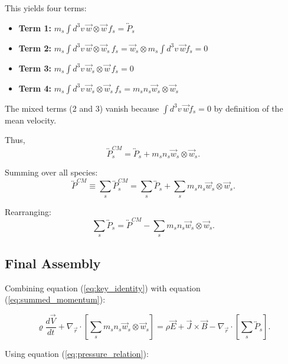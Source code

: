This yields four terms:
\begin{itemize}
\item \textbf{Term 1:} $\displaystyle m_s \int d^3v \, \vec{w} \otimes \vec{w} \, f_s = \overleftrightarrow{P}_s$
\item \textbf{Term 2:} $\displaystyle m_s \int d^3v \, \vec{w} \otimes \vec{w}_s \, f_s = \vec{w}_s \otimes m_s \int d^3v \, \vec{w} f_s = 0$
\item \textbf{Term 3:} $\displaystyle m_s \int d^3v \, \vec{w}_s \otimes \vec{w} \, f_s = 0$
\item \textbf{Term 4:} $\displaystyle m_s \int d^3v \, \vec{w}_s \otimes \vec{w}_s \, f_s = m_s n_s \vec{w}_s \otimes \vec{w}_s$
\end{itemize}

The mixed terms (2 and 3) vanish because $\int d^3v \, \vec{w} f_s = 0$ by definition of the mean velocity.

Thus,
\begin{equation*}
\overleftrightarrow{P}_s^{CM} = \overleftrightarrow{P}_s + m_s n_s \vec{w}_s \otimes \vec{w}_s.
\end{equation*}

Summing over all species:
\begin{equation}
\overleftrightarrow{P}^{CM} \equiv \sum_s \overleftrightarrow{P}_s^{CM} = \sum_s \overleftrightarrow{P}_s + \sum_s m_s n_s \vec{w}_s \otimes \vec{w}_s.
\label{eq:pressure_relation}
\end{equation}

Rearranging:
\begin{equation*}
\sum_s \overleftrightarrow{P}_s = \overleftrightarrow{P}^{CM} - \sum_s m_s n_s \vec{w}_s \otimes \vec{w}_s.
\end{equation*}

\subsection*{Final Assembly}

Combining equation (\ref{eq:key_identity}) with equation (\ref{eq:summed_momentum}):

\begin{equation*}
\varrho \frac{d\vec{V}}{dt} + \nabla_{\vec{r}} \cdot \left[\sum_s m_s n_s \vec{w}_s \otimes \vec{w}_s\right] = \rho \vec{E} + \vec{J} \times \vec{B} - \nabla_{\vec{r}} \cdot \left[\sum_s \overleftrightarrow{P}_s\right].
\end{equation*}

Using equation (\ref{eq:pressure_relation}):

